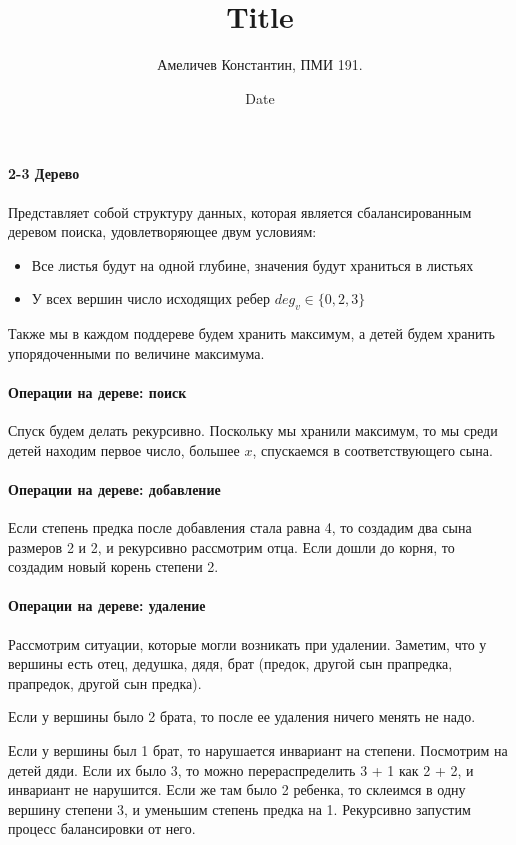 \documentclass[12pt]{article}
\title{Title}
\author{Амеличев Константин, ПМИ 191.}
\date{Date}
\begin{document}
\paragraph{2-3 Дерево} 

\hspace{\fill}

Представляет собой структуру данных, которая является сбалансированным деревом поиска, удовлетворяющее двум условиям:

\begin{itemize}

\item Все листья будут на одной глубине, значения будут храниться в листьях

\item У всех вершин число исходящих ребер $deg_v \in \{0, 2, 3\}$

\end{itemize}

Также мы в каждом поддереве будем хранить максимум, а детей будем хранить упорядоченными по величине максимума.

\paragraph{Операции на дереве: поиск} Спуск будем делать рекурсивно. Поскольку мы хранили максимум, то мы среди детей находим первое число, большее $x$, спускаемся в соответствующего сына.

\paragraph{Операции на дереве: добавление} Если степень предка после добавления стала равна 4, то создадим два сына размеров 2 и 2, и рекурсивно рассмотрим отца. Если дошли до корня, то создадим новый корень степени 2.

\paragraph{Операции на дереве: удаление} Рассмотрим ситуации, которые могли возникать при удалении. Заметим, что у вершины есть отец, дедушка, дядя, брат (предок, другой сын прапредка, прапредок, другой сын предка).

Если у вершины было 2 брата, то после ее удаления ничего менять не надо.

Если у вершины был 1 брат, то нарушается инвариант на степени. Посмотрим на детей дяди. Если их было 3, то можно перераспределить 3 + 1 как 2 + 2, и инвариант не нарушится. Если же там было 2 ребенка, то склеимся в одну вершину степени 3, и уменьшим степень предка на 1. Рекурсивно запустим процесс балансировки от него.
\end{document}
